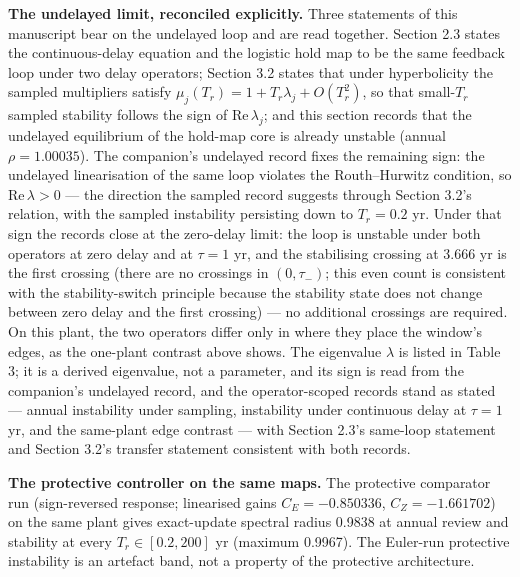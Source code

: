 \documentclass[11pt]{article}
\begin{document}
\textbf{The undelayed limit, reconciled explicitly.} Three statements of
this manuscript bear on the undelayed loop and are read together.
Section 2.3 states the continuous-delay
equation and the logistic hold map to be the same feedback loop under
two delay operators; Section 3.2 states that under hyperbolicity the
sampled multipliers satisfy
\(\mu_j(T_r) = 1 + T_r\lambda_j + O(T_r^2)\), so that small-\(T_r\)
sampled stability follows the sign of \(\mathrm{Re}\,\lambda_j\); and this section records that the undelayed equilibrium
of the hold-map core is already unstable (annual \(\rho = 1.00035\)).
The companion's undelayed record fixes the remaining sign: the undelayed
linearisation of the same loop violates the Routh--Hurwitz condition, so
\(\mathrm{Re}\,\lambda > 0\) --- the direction the sampled record suggests through
Section 3.2's relation, with the sampled instability persisting down to
\(T_r = 0.2\) yr. Under that sign the records close at the zero-delay
limit: the loop is unstable under both operators at zero delay and at
\(\tau = 1\) yr, and the stabilising crossing at 3.666 yr is the first
crossing (there are no crossings in \((0,\tau_-)\); this even count is consistent with the stability-switch principle because the stability state does not change between zero delay and the first crossing) --- no
additional crossings are required. On this plant, the two operators differ only in
where they place the window's edges, as the one-plant contrast above
shows. The eigenvalue \(\lambda\) is listed in Table 3; it is a derived eigenvalue, not a parameter, and its sign is read from
the companion's undelayed record, and the operator-scoped records stand
as stated --- annual instability under sampling, instability under
continuous delay at \(\tau = 1\) yr, and the same-plant edge contrast
--- with Section 2.3's same-loop statement and Section 3.2's transfer
statement consistent with both records.

\textbf{The protective controller on the same maps.} The protective
comparator run (sign-reversed response; linearised gains \(C_E = -0.850336\), \(C_Z = -1.661702\)) on the same plant
gives exact-update spectral radius 0.9838 at annual review and stability
at every \(T_r \in [0.2, 200]\) yr (maximum 0.9967). The Euler-run
protective instability is an artefact band, not a property of the
protective architecture.
\end{document}
